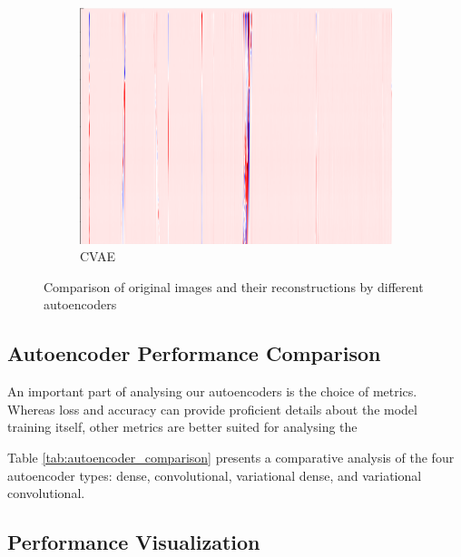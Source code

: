 \begin{figure}[!h]
\begin{subfigure}{0.33\textwidth}
        \includegraphics[width=\textwidth]{figures/test.png}
        \caption{CVAE}
    \end{subfigure}
    
    \caption{Comparison of original images and their reconstructions by different autoencoders}
    \label{fig:aereconstruct}
\end{figure}

\subsection{Autoencoder Performance Comparison}

An important part of analysing our autoencoders is the choice of metrics. Whereas loss and accuracy can provide proficient details about the model training itself, other metrics are better suited for analysing the 

Table \ref{tab:autoencoder_comparison} presents a comparative analysis of the four autoencoder types: dense, convolutional, variational dense, and variational convolutional.



\subsection{Performance Visualization}


